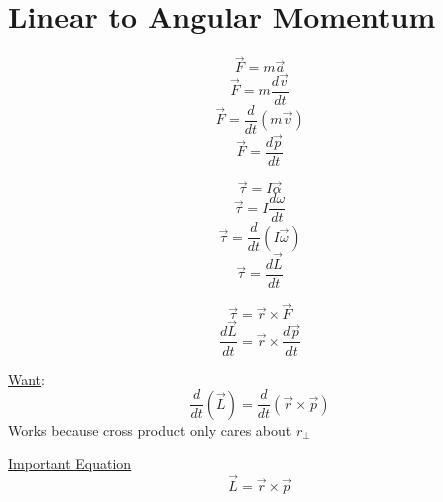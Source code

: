 \documentclass[fleqn]{article}
\begin{document}
\setlength{\mathindent}{0pt}
\section*{Linear to Angular Momentum}
\[ \vec{F} = m \vec{a}  \]
\[ \vec{F} = m \frac{d \vec{v} }{dt}  \]
\[ \vec{F} = \frac{d}{dt} (m \vec{v} ) \]
\[ \vec{F} = \frac{d \vec{p} }{dt}  \]

\[ \vec{\tau} = I \vec{\alpha }  \]
\[ \vec{\tau} = I \frac{d \omega }{dt}  \]
\[ \vec{\tau} = \frac{d}{dt} (I \vec{\omega } ) \]
\[ \vec{\tau} = \frac{d \vec{L} }{dt}   \]

\[\vec{\tau} = \vec{r} \times \vec{F}\]
\[\frac{d \vec{L} }{dt} = \vec{r} \times \frac{d \vec{p} }{dt}   \]

\underline{Want}:
\[\frac{d}{dt} (\vec{L} ) = \frac{d}{dt} (\vec{r} \times \vec{p}) \]
Works because cross product only cares about $r_\perp$

\underline{Important Equation}
\[ \vec{L} = \vec{r} \times \vec{p}  \]
\end{document}
